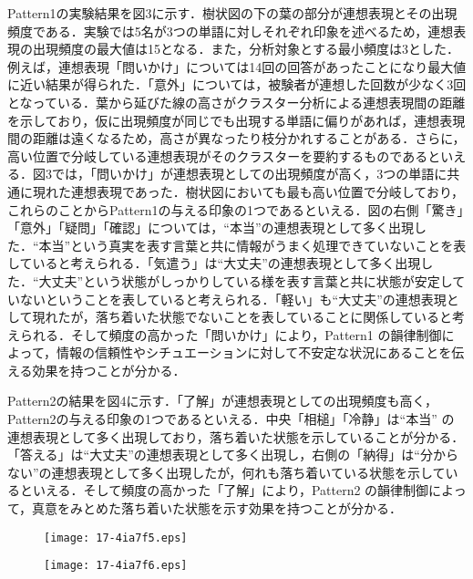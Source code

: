 \documentclass[japanese]{jnlp_1.4}
\begin{document}
Pattern1の実験結果を図3に示す．樹状図の下の葉の部分が連想表現とその出現頻度である．実験では5名が3つの単語に対しそれぞれ印象を述べるため，連想表現の出現頻度の最大値は15となる．また，分析対象とする最小頻度は3とした．例えば，連想表現「問いかけ」については14回の回答があったことになり最大値に近い結果が得られた．「意外」については，被験者が連想した回数が少なく3回となっている．葉から延びた線の高さがクラスター分析による連想表現間の距離を示しており，仮に出現頻度が同じでも出現する単語に偏りがあれば，連想表現間の距離は遠くなるため，高さが異なったり枝分かれすることがある．さらに，高い位置で分岐している連想表現がそのクラスターを要約するものであるといえる．図3では，「問いかけ」が連想表現としての出現頻度が高く，3つの単語に共通に現れた連想表現であった．樹状図においても最も高い位置で分岐しており，これらのことからPattern1の与える印象の1つであるといえる．図の右側「驚き」「意外」「疑問」「確認」については，“本当”の連想表現として多く出現した．“本当”という真実を表す言葉と共に情報がうまく処理できていないことを表していると考えられる．「気遣う」は“大丈夫”の連想表現として多く出現した．“大丈夫”という状態がしっかりしている様を表す言葉と共に状態が安定していないということを表していると考えられる．「軽い」も“大丈夫”の連想表現として現れたが，落ち着いた状態でないことを表していることに関係していると考えられる．そして頻度の高かった「問いかけ」により，Pattern1 の韻律制御によって，情報の信頼性やシチュエーションに対して不安定な状況にあることを伝える効果を持つことが分かる．


Pattern2の結果を図4に示す．「了解」が連想表現としての出現頻度も高く，Pattern2の与える印象の1つであるといえる．中央「相槌」「冷静」は“本当” の連想表現として多く出現しており，落ち着いた状態を示していることが分かる．「答える」は“大丈夫”の連想表現として多く出現し，右側の「納得」は“分からない”の連想表現として多く出現したが，何れも落ち着いている状態を示しているといえる．そして頻度の高かった「了解」により，Pattern2 の韻律制御によって，真意をみとめた落ち着いた状態を示す効果を持つことが分かる．

\begin{figure}[b]
\setlength{\captionwidth}{0.45\textwidth}
 \begin{minipage}{0.45\textwidth}
  \begin{center}
 \texttt{[image: 17-4ia7f5.eps]}
  \end{center}
  \label{fig:three}
 \end{minipage}
\hfill
 \begin{minipage}{0.45\textwidth}
  \begin{center}
 \texttt{[image: 17-4ia7f6.eps]}
  \end{center}
  \label{fig:four}
 \end{minipage}
\end{figure}
\end{document}
